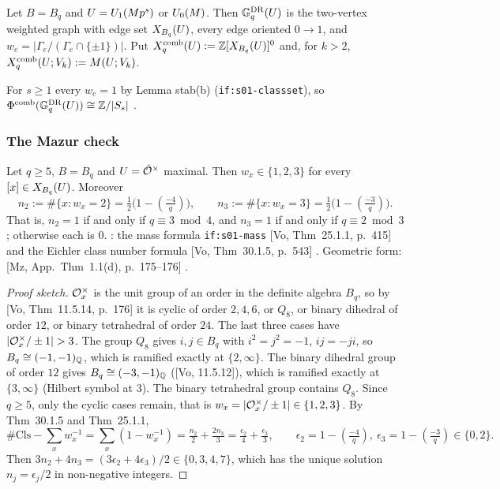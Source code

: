 \begin{definition}\label{def:s03-DR}
Let $B=B_q$ and $U=U_1(Mp^s)$ or $U_0(M)$. Then $\mathbb{G}^{\mathrm{DR}}_q(U)$ is the two-vertex weighted graph with edge set $X_{B_q}(U)$, every edge
oriented $0\to1$, and $w_e=|\Gamma_e/(\Gamma_e\cap\{\pm1\})|$. Put $X^{\mathrm{comb}}_q(U):=\mathbb{Z}[X_{B_q}(U)]^0$ and, for $k>2$,
$X^{\mathrm{comb}}_q(U;V_k):=M(U;V_k)$. 
\end{definition}

For $s\ge1$ every $w_e=1$ by Lemma stab(b) (\texttt{if:s01-classset}), so $\Phi^{\mathrm{comb}}(\mathbb{G}^{\mathrm{DR}}_q(U))\cong\mathbb{Z}/|S_s|$ \stproved.

\subsubsection{The Mazur check}
\begin{lemma}\label{lem:s03-elliptic}
Let $q\ge5$, $B=B_q$ and $U=\hat{\mathcal{O}}^\times$ maximal. Then $w_x\in\{1,2,3\}$ for every $[x]\in X_{B_q}(U)$. Moreover
\[n_2:=\#\{x:w_x=2\}=\tfrac12\big(1-(\tfrac{-4}q)\big),\qquad n_3:=\#\{x:w_x=3\}=\tfrac12\big(1-(\tfrac{-3}q)\big).\]
That is, $n_2=1$ if and only if $q\equiv3\bmod4$, and $n_3=1$ if and only if $q\equiv2\bmod3$; otherwise each is $0$.
\stpmc: the mass formula \texttt{if:s01-mass} [Vo, Thm~25.1.1, p.~415] 
and the Eichler class number formula [Vo, Thm~30.1.5, p.~543] .
Geometric form: [Mz, App.\ Thm~1.1(d), p.~175--176] .
\end{lemma}
\begin{proof}[Proof sketch]
$\mathcal{O}_x^\times$ is the unit group of an order in the definite algebra $B_q$, so by [Vo, Thm~11.5.14, p.~176]
 \stcited{} it is cyclic of order $2,4,6$, or $Q_8$, or binary dihedral of
order $12$, or binary tetrahedral of order $24$. The last three cases have $|\cO_x^\times/\pm1|>3$. The group $Q_8$ gives $i,j\in B_q$
with $i^2=j^2=-1$, $ij=-ji$, so $B_q\cong(-1,-1)_{\mathbb{Q}}$, which is ramified exactly at $\{2,\infty\}$. The binary dihedral group of order $12$
gives $B_q\cong(-3,-1)_{\mathbb{Q}}$ ([Vo, 11.5.12]), which is ramified exactly at $\{3,\infty\}$ (Hilbert symbol at $3$). The binary tetrahedral group
contains $Q_8$. Since $q\ge5$, only the cyclic cases remain, that is $w_x=|\mathcal{O}_x^\times/\pm1|\in\{1,2,3\}$.
By Thm~30.1.5 and Thm~25.1.1,
\[\#\mathrm{Cls}-\sum_x w_x^{-1}=\sum_x(1-w_x^{-1})=\tfrac{n_2}2+\tfrac{2n_3}3=\tfrac{\epsilon_2}4+\tfrac{\epsilon_3}3,\qquad
\epsilon_2=1-(\tfrac{-4}q),\ \epsilon_3=1-(\tfrac{-3}q)\in\{0,2\}.\]
Then $3n_2+4n_3=(3\epsilon_2+4\epsilon_3)/2\in\{0,3,4,7\}$, which has the unique solution $n_j=\epsilon_j/2$ in non-negative integers.
\end{proof}


